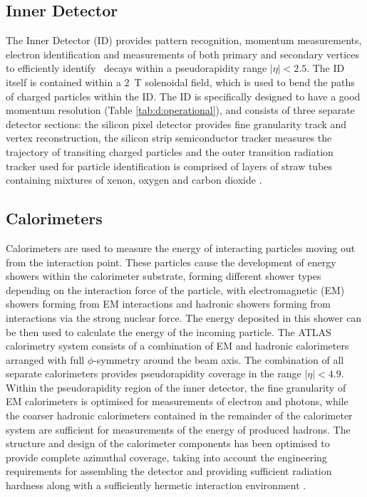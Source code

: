 	\subsection{Inner Detector}
	\label{d:id}

		The Inner Detector \cite{innerdetector} (ID) provides pattern recognition, momentum measurements, electron identification and measurements of both primary and secondary vertices to efficiently identify \bhadron\, decays within a pseudorapidity range $|\eta|<2.5$. The ID itself is contained within a $2$~T solenoidal field, which is used to bend the paths of charged particles within the ID. The ID is specifically designed to have a good momentum resolution (Table \ref{tab:d:operational}), and consists of three separate detector sections: the silicon pixel detector provides fine granularity track and vertex reconstruction, the silicon strip semiconductor tracker measures the trajectory of transiting charged particles and the outer transition radiation tracker used for particle identification is comprised of layers of straw tubes containing mixtures of xenon, oxygen and carbon dioxide \cite{ATLAS}.

	\subsection{Calorimeters}
	\label{d:cal}

		Calorimeters are used to measure the energy of interacting particles moving out from the interaction point. These particles cause the development of energy showers within the calorimeter substrate, forming different shower types depending on the interaction force of the particle, with electromagnetic (EM)  showers forming from EM interactions and hadronic showers forming from interactions via the strong nuclear force. The energy deposited in this shower can be then used to calculate the energy of the incoming particle. The ATLAS calorimetry system consists of a combination of EM and hadronic calorimeters arranged with full $\phi$-symmetry around the beam axis. The combination of all separate calorimeters provides pseudorapidity coverage in the range $|\eta| < 4.9$. Within the pseudorapidity region of the inner detector, the fine granularity of EM calorimeters is optimised for measurements of electron and photons, while the coarser hadronic calorimeters contained in the remainder of the calorimeter system are sufficient for measurements of the energy of produced hadrons. The structure and design of the calorimeter components has been optimised to provide complete azimuthal coverage, taking into account the engineering requirements for assembling the detector and providing sufficient radiation hardness along with a sufficiently hermetic interaction environment \cite{ATLAS}.

